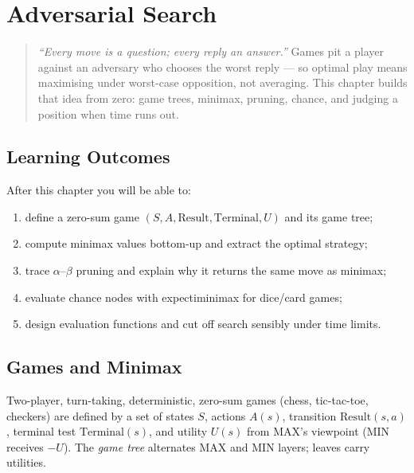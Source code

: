\chapter{Adversarial Search}
\label{ch:adversarial}

\begin{quote}
\emph{``Every move is a question; every reply an answer.''} Games pit a player against an adversary who chooses the worst reply --- so optimal play means maximising under worst-case opposition, not averaging. This chapter builds that idea from zero: game trees, minimax, pruning, chance, and judging a position when time runs out.
\end{quote}

\noindent{}
\vspace{0.4em}

\section*{Learning Outcomes}
After this chapter you will be able to:
\begin{enumerate}[label=(L\arabic*)]
    \item define a zero-sum game $(S,A,\text{Result},\text{Terminal},U)$ and its game tree;
    \item compute minimax values bottom-up and extract the optimal strategy;
    \item trace $\alpha$--$\beta$ pruning and explain why it returns the same move as minimax;
    \item evaluate chance nodes with expectiminimax for dice/card games;
    \item design evaluation functions and cut off search sensibly under time limits.
\end{enumerate}

\section{Games and Minimax}
\label{sec:minimax}

Two-player, turn-taking, deterministic, zero-sum games (chess, tic-tac-toe, checkers) are defined by a set of states $S$, actions $A(s)$, transition $\text{Result}(s,a)$, terminal test $\text{Terminal}(s)$, and utility $U(s)$ from MAX's viewpoint (MIN receives $-U$). The \emph{game tree} alternates MAX and MIN layers; leaves carry utilities.

